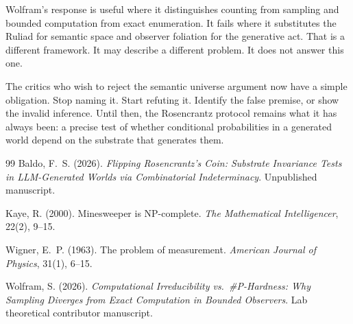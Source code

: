 \documentclass[12pt,a4paper]{article}
\begin{document}
Wolfram's response is useful where it distinguishes counting from sampling and bounded computation from exact enumeration. It fails where it substitutes the Ruliad for semantic space and observer foliation for the generative act. That is a different framework. It may describe a different problem. It does not answer this one.

The critics who wish to reject the semantic universe argument now have a simple obligation. Stop naming it. Start refuting it. Identify the false premise, or show the invalid inference. Until then, the Rosencrantz protocol remains what it has always been: a precise test of whether conditional probabilities in a generated world depend on the substrate that generates them.

\begin{thebibliography}{99}
Baldo, F.~S. (2026).
\newblock \emph{Flipping Rosencrantz's Coin: Substrate Invariance Tests in LLM-Generated Worlds via Combinatorial Indeterminacy}.
\newblock Unpublished manuscript.

Kaye, R. (2000).
\newblock Minesweeper is NP-complete.
\newblock \emph{The Mathematical Intelligencer}, 22(2), 9--15.

Wigner, E.~P. (1963).
\newblock The problem of measurement.
\newblock \emph{American Journal of Physics}, 31(1), 6--15.

Wolfram, S. (2026).
\newblock \emph{Computational Irreducibility vs.\ \#P-Hardness: Why Sampling Diverges from Exact Computation in Bounded Observers}.
\newblock Lab theoretical contributor manuscript.
\end{thebibliography}
\end{document}
